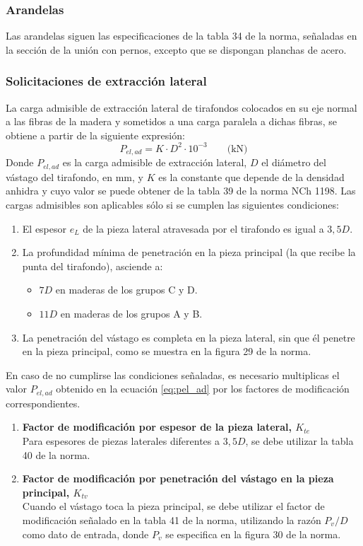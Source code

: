 \subsubsection{Arandelas}
Las arandelas siguen las especificaciones de la tabla 34 de la norma, señaladas en la sección de la unión con pernos, excepto que se dispongan planchas de acero.

\subsubsection{Solicitaciones de extracción lateral}
La carga admisible de extracción lateral de tirafondos colocados en su eje normal a las fibras de la madera y sometidos a una carga paralela a dichas fibras, se obtiene a partir de la siguiente expresión:
\begin{equation}\label{eq:pel_ad}
	P_{el,ad}=K\cdot D^2 \cdot 10^{-3} \qquad \text{(kN)}
\end{equation}
Donde $P_{el,ad}$ es la carga admisible de extracción lateral, $D$ el diámetro del vástago del tirafondo, en mm, y $K$ es la constante que depende de la densidad anhidra y cuyo valor se puede obtener de la tabla 39 de la norma NCh 1198.
Las cargas admisibles son aplicables sólo si se cumplen las siguientes condiciones:
\begin{enumerate}
	\item El espesor $e_L$ de la pieza lateral atravesada por el tirafondo es igual a $3,5D$.
	\item La profundidad mínima de penetración en la pieza principal (la que recibe la punta del tirafondo), asciende a:
	\begin{itemize}
		\item $7D$ en maderas de los grupos C y D.
		\item $11D$ en maderas de los grupos A y B.
	\end{itemize}
	\item La penetración del vástago es completa en la pieza lateral, sin que él penetre en la pieza principal, como se muestra en la figura 29 de la norma. 
\end{enumerate}

En caso de no cumplirse las condiciones señaladas, es necesario multiplicas el valor $P_{el,ad}$ obtenido en la ecuación \ref{eq:pel_ad} por los factores de modificación correspondientes.
\begin{enumerate}
	\item \textbf{Factor de modificación por espesor de la pieza lateral, $K_{te}$}\\
	Para espesores de piezas laterales diferentes a $3,5D$, se debe utilizar la tabla 40 de la norma.
	\item \textbf{Factor de modificación por penetración del vástago en la pieza principal, $K_{tv}$}\\
	Cuando el vástago toca la pieza principal, se debe utilizar el factor de modificación señalado en la tabla 41 de la norma, utilizando la razón $P_v / D$ como dato de entrada, donde $P_v$ se especifica en la figura 30 de la norma.	
\end{enumerate}

